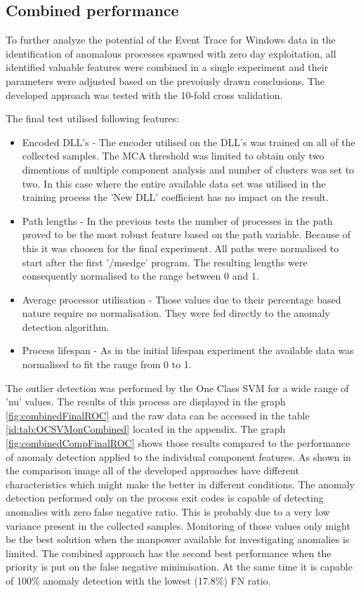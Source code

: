 \documentclass[a4paper,twoside,12pt]{book}
\begin{document}
\subsection{Combined performance}

To further analyze the potential of the Event Trace for Windows data in the identification of
anomalous processes spawned with zero day exploitation, all identified valuable features were
combined in a single experiment and their parameters were adjusted based on the prevoiusly drawn 
conclusions. The developed approach was tested with the 10-fold cross validation.

The final test utilised following features:
\begin{itemize}
	\item Encoded DLL's - The encoder utilised on the DLL's was trained on all of the collected samples. The MCA 
	threshold was limited to obtain only two dimentions of multiple component analysis and number of clusters was set 
	to two. In this case where the entire available data set was utilised in the training process the 'New DLL'
	coefficient has no impact on the result.  
	\item Path lengths - In the previous tests the number of processes in the path proved to be the most robust feature
	based on the path variable. Because of this it was choosen for the final experiment. All paths were normalised to start
	after the first '/msedge' program. The resulting lengths were consequently normalised to the range between 0 and 1.
	\item Average processor utilisation - Those values due to their percentage based nature require no normalisation. They 
	were fed directly to the anomaly detection algorithm. 
	\item Process lifespan - As in the initial lifespan experiment the available data was normalised to fit the range from 0 to 1.
\end{itemize}

The outlier detection was performed by the One Class SVM for a wide range of 'nu' values. The results of 
this process are displayed in the graph \ref{fig:combinedFinalROC} and the raw data can be accessed in the table 
\ref{id:tab:OCSVMonCombined} located in the appendix. The graph \ref{fig:combinedCompFinalROC} shows those results compared to 
the performance of anomaly detection applied to the individual component features. As shown in the comparison image all of the 
developed approaches have different characteristics which might make the better in different conditions. The anomaly detection
performed only on the process exit codes is capable of detecting anomalies with zero false negative ratio. This is probably
due to a very low variance present in the collected samples. Monitoring of those values only might be the best solution when
the manpower available for investigating anomalies is limited. The combined approach has the second best performance when
the priority is put on the false negative minimisation. At the same time it is capable of 100\% anomaly detection with the lowest
(17.8\%) FN ratio.
\end{document}

